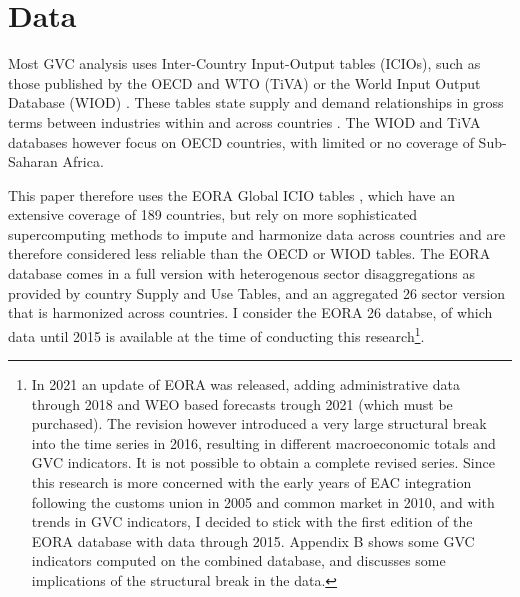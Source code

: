 \documentclass[a4paper]{article}
\begin{document}
\section{Data}
Most GVC analysis uses Inter-Country Input-Output tables (ICIOs), such as those
published by the OECD and WTO (TiVA) or the World Input Output Database (WIOD)  \citep{timmer2012world}. These tables state supply and demand relationships in gross terms between industries within and across countries \citep{Kummritz2014}. The WIOD and TiVA databases however focus on OECD countries, with limited or no coverage of Sub-Saharan Africa. \newline


This paper therefore uses the EORA Global ICIO tables \citep{lenzen2012mapping, lenzen2013building}, which have an extensive coverage of 189 countries, but rely on more sophisticated supercomputing methods to impute and harmonize data across countries and are therefore considered less reliable than the OECD or WIOD tables. %
The EORA database comes in a full version with heterogenous sector disaggregations as provided by country Supply and Use Tables, and an aggregated 26 sector version that is harmonized across countries. I consider the EORA 26 databse, of which data until 2015 is available at the time of conducting this research\footnote{In 2021 an update of EORA was released, adding administrative data through 2018 and WEO based forecasts trough 2021 (which must be purchased). The revision however introduced a very large structural break into the time series in 2016, resulting in different macroeconomic totals and GVC indicators. It is not possible to obtain a complete revised series. Since this research is more concerned with the early years of EAC integration following the customs union in 2005 and common market in 2010, and with trends in GVC indicators, I decided to stick with the first edition of the EORA database with data through 2015. Appendix B shows some GVC indicators computed on the combined database, and discusses some implications of the structural break in the data. }. 
\end{document}
